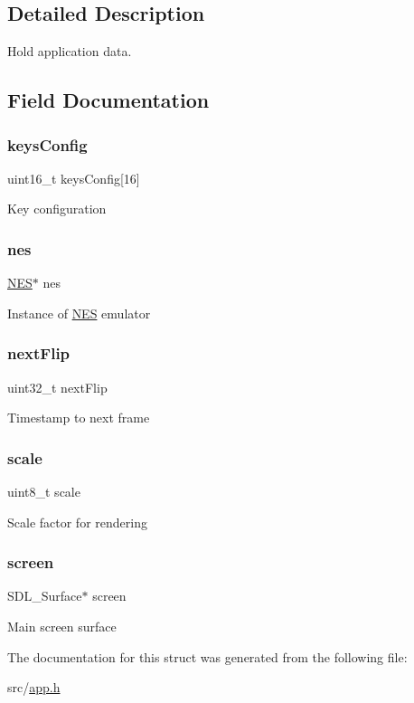 \subsection{Detailed Description}
Hold application data. 

\subsection{Field Documentation}
\mbox{\label{struct_app_ae6ca1436ec0a9fd20c44b9a789f748dd}} 
\subsubsection{\texorpdfstring{keys\+Config}{keysConfig}}
{\footnotesize\ttfamily uint16\+\_\+t keys\+Config\mbox{[}16\mbox{]}}

Key configuration \mbox{\label{struct_app_ad114e77101488c8e1bcc3a9dec07a54a}} 
\subsubsection{\texorpdfstring{nes}{nes}}
{\footnotesize\ttfamily \hyperlink{struct_n_e_s}{N\+ES}$\ast$ nes}

Instance of \hyperlink{struct_n_e_s}{N\+ES} emulator \mbox{\label{struct_app_a08de9232616eaf6a59a7cf46e2b5f437}} 
\subsubsection{\texorpdfstring{next\+Flip}{nextFlip}}
{\footnotesize\ttfamily uint32\+\_\+t next\+Flip}

Timestamp to next frame \mbox{\label{struct_app_a616c0a72f0e4af38b93c736773ac7210}} 
\subsubsection{\texorpdfstring{scale}{scale}}
{\footnotesize\ttfamily uint8\+\_\+t scale}

Scale factor for rendering \mbox{\label{struct_app_a78fa3957d73de49cb81d047857504218}} 
\subsubsection{\texorpdfstring{screen}{screen}}
{\footnotesize\ttfamily S\+D\+L\+\_\+\+Surface$\ast$ screen}

Main screen surface 

The documentation for this struct was generated from the following file\+:\begin{DoxyCompactItemize}
\item 
src/\hyperlink{app_8h}{app.\+h}\end{DoxyCompactItemize}
